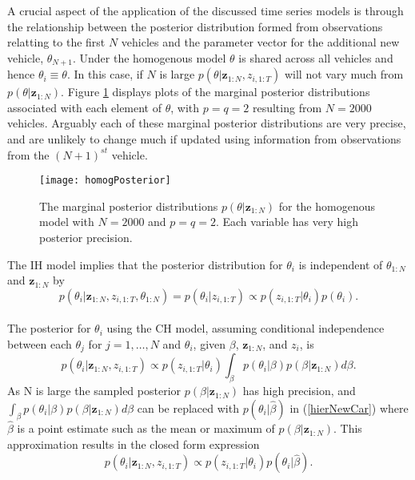 \documentclass[12pt,a4paper]{article}\usepackage[]{graphicx}\usepackage[]{color}
\begin{document}
A crucial aspect of the application of the discussed time series models is through the relationship between the posterior distribution formed from observations relatting to the first $N$ vehicles and the parameter vector for the additional new vehicle, $\theta_{N+1}$. Under the homogenous model $\theta$ is shared across all vehicles and hence $\theta_{i} \equiv \theta$. In this case, if $N$ is large $p(\theta | \textbf{z}_{1:N}, z_{i, 1:T})$ will not vary much from $p(\theta | \textbf{z}_{1:N})$. Figure \ref{fig:homogPosterior} displays plots of the marginal posterior distributions associated with each element of $\theta$, with $p = q = 2$ resulting from $N = 2000$ vehicles. Arguably each of these marginal posterior distributions are very precise, and are unlikely to change much if updated using information from observations from the $(N+1)^{st}$ vehicle.

\begin{figure}
\centering
\texttt{[image: homogPosterior]}
\caption{The marginal posterior distributions $p(\theta | \textbf{z}_{1:N})$ for the homogenous model with $N = 2000$ and $p = q = 2$. Each variable has very high posterior precision.}
\label{fig:homogPosterior}
\end{figure}

The IH model implies that the posterior distribution for $\theta_i$ is independent of $\theta_{1:N}$ and $\textbf{z}_{1:N}$ by
\begin{equation}
p(\theta_{i}| \textbf{z}_{1:N}, z_{i,1:T}, \theta_{1:N}) = p(\theta_{i} | z_{i, 1:T}) \propto p(z_{i, 1:T} | \theta_i) p(\theta_i).
\label{indepNewCar}
\end{equation}
\\

The posterior for $\theta_i$ using the CH model, assuming conditional independence between each $\theta_j$ for $j = 1, \dots, N$ and $\theta_i$, given $\beta$, $\textbf{z}_{1:N}$, and $z_i$, is
\begin{equation}
\label{hierNewCar}
p(\theta_{i} | \textbf{z}_{1:N}, z_{i, 1:T}) \propto p(z_{i, 1:T} | \theta_{i}) \int_{\beta} p(\theta_{i} | \beta) p (\beta | \textbf{z}_{1:N}) d\beta.
\end{equation}
As N is large the sampled posterior $p(\beta | \textbf{z}_{1:N})$ has high precision, and $\int_{\beta} p(\theta_{i} | \beta) p (\beta | \textbf{z}_{1:N}) d\beta$ can be replaced with $p(\theta_{i} | \hat{\beta})$ in (\ref{hierNewCar}) where $\hat{\beta}$ is a point estimate such as the mean or maximum of $p(\beta | \textbf{z}_{1:N})$. This approximation results in the closed form expression
\begin{equation}
\label{hierNewCar2}
p(\theta_{i} | \textbf{z}_{1:N}, z_{i, 1:T}) \propto p(z_{i, 1:T} | \theta_{i}) p(\theta_{i} | \hat{\beta}).
\end{equation}
\\
\end{document}

